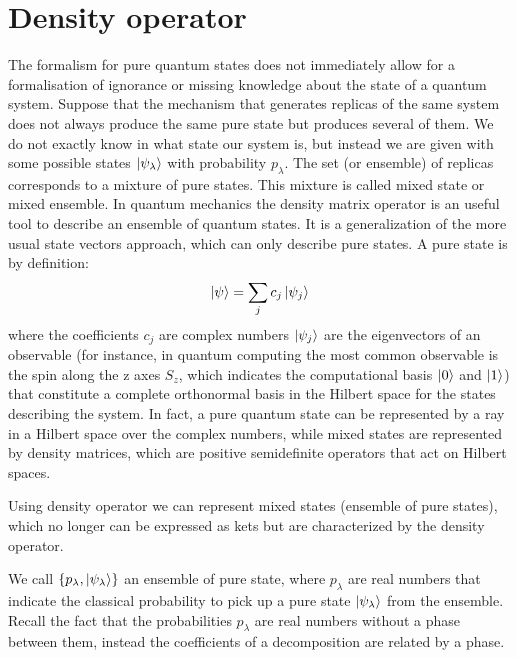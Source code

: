 





\section{Density operator}
The formalism for pure quantum states does not immediately allow for a formalisation of ignorance or missing knowledge about the state of a quantum system.
Suppose that the mechanism that generates replicas of the same system does not always produce the same pure state but produces several of them. We do not exactly know in what state our system is, but instead we are given with some possible states $\ket{\psi_{\lambda}}$ with probability $p_{\lambda}$. The set (or ensemble) of replicas corresponds to a mixture of pure states. This mixture is called mixed state or mixed ensemble. 
In quantum mechanics the density matrix operator is an useful tool to describe an ensemble of quantum states. It is a generalization of the more usual state vectors approach, which can only describe pure states. 
A pure state is by definition:
\begin{equation}
    \ket{\psi} = \sum_j c_j \ket{\psi_j}
\end{equation}
where the coefficients $c_j$ are complex numbers $\ket{\psi_j}$ are the eigenvectors of an observable (for instance, in quantum computing the most common observable is the spin along the z axes $S_z$, which indicates the computational basis $\ket{0}$ and $\ket{1}$) that constitute a complete orthonormal basis in the Hilbert space for the states describing the system.
In fact, a pure quantum state can be represented by a ray in a Hilbert space over the complex numbers, while mixed states are represented by density matrices, which are positive semidefinite operators that act on Hilbert spaces.


Using density operator we can represent mixed states (ensemble of pure states), which no longer can be expressed as kets but are characterized by the density operator. 


We call $\{p_{\lambda}, \ket{\psi_{\lambda}} \}$ an ensemble of pure state, where $p_{\lambda}$ are real numbers that indicate the classical probability to pick up a pure state $\ket{\psi_{\lambda}}$ from the ensemble. Recall the fact that the probabilities $p_{\lambda}$ are real numbers without a phase between them, instead the coefficients of a decomposition are related by a phase. 

